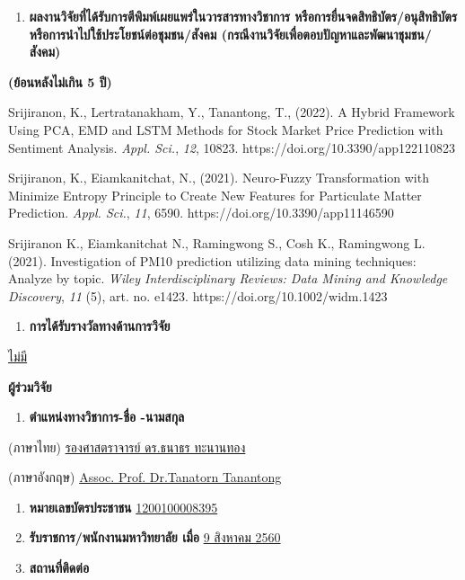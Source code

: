 \documentclass[16pt]{extarticle}
\begin{document}
\begin{enumerate}
\def\labelenumi{\arabic{enumi}.}
\setcounter{enumi}{6}
\item
  \textbf{ผลงานวิจัยที่ได้รับการตีพิมพ์เผยแพร่ในวารสารทางวิชาการ
  หรือการยื่นจดสิทธิบัตร/อนุสิทธิบัตร หรือการนำไปใช้ประโยชน์ต่อชุมชน/สังคม
  (กรณีงานวิจัยเพื่อตอบปัญหาและพัฒนาชุมชน/สังคม)}
\end{enumerate}

\textbf{(ย้อนหลังไม่เกิน 5 ปี)}

Srijiranon, K., Lertratanakham, Y., Tanantong, T., (2022). A Hybrid
Framework Using PCA, EMD and LSTM Methods for Stock Market Price
Prediction with Sentiment Analysis. \emph{Appl. Sci.}, \emph{12}, 10823.
https://doi.org/10.3390/app122110823

Srijiranon, K., Eiamkanitchat, N., (2021). Neuro-Fuzzy Transformation
with Minimize Entropy Principle to Create New Features for Particulate
Matter Prediction. \emph{Appl. Sci.}, \emph{11}, 6590.
https://doi.org/10.3390/app11146590

Srijiranon K., Eiamkanitchat N., Ramingwong S., Cosh K., Ramingwong L.
(2021). Investigation of PM10 prediction utilizing data mining
techniques: Analyze by topic. \emph{Wiley Interdisciplinary Reviews:
Data Mining and Knowledge Discovery}, \emph{11} (5), art. no. e1423.
https://doi.org/10.1002/widm.1423

\begin{enumerate}
\def\labelenumi{\arabic{enumi}.}
\setcounter{enumi}{7}
\item
  \textbf{การได้รับรางวัลทางด้านการวิจัย}
\end{enumerate}

\uline{ไม่มี}



\textbf{ผู้ร่วมวิจัย}

\begin{enumerate}
\def\labelenumi{\arabic{enumi}.}
\item
  \textbf{ตำแหน่งทางวิชาการ-ชื่อ -นามสกุล}
\end{enumerate}

\noindent\hspace{1em}(ภาษาไทย) \uline{รองศาสตราจารย์ ดร.ธนาธร ทะนานทอง}

\noindent\hspace{1em}(ภาษาอังกฤษ) \uline{Assoc. Prof. Dr.Tanatorn Tanantong}

\begin{enumerate}
\def\labelenumi{\arabic{enumi}.}
\setcounter{enumi}{1}
\item
  \textbf{หมายเลขบัตรประชาชน} \uline{1200100008395}
\item
  \textbf{รับราชการ/พนักงานมหาวิทยาลัย เมื่อ} \uline{9 สิงหาคม 2560}
\item
  \textbf{สถานที่ติดต่อ}
\end{enumerate}
\end{document}
